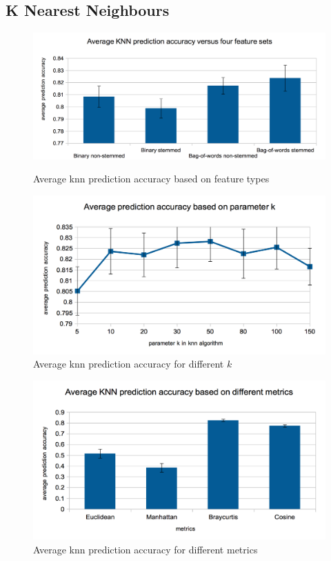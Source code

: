 \documentclass{acm_proc_article-sp}
\begin{document}
\subsection{K Nearest Neighbours}
\begin{figure} 
\includegraphics[width=1\columnwidth]{images/knn_feature_types.png}  \label{fig:k1}
\caption{Average knn prediction accuracy based on feature types}
\end{figure}

\begin{figure}
\includegraphics[width=1\columnwidth]{images/knn_k.png}  
\caption{Average knn prediction accuracy for different $k$} \label{fig:k2}
\end{figure}

\begin{figure}
\includegraphics[width=1\columnwidth]{images/knn_metrics.png}  
\caption{Average knn prediction accuracy for different metrics} \label{fig:k3}
\end{figure}
\end{document}
